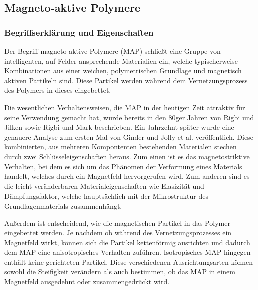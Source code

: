 \subsection{Magneto-aktive Polymere}\label{kap_MAP}
\subsubsection{Begriffserklärung und Eigenschaften}
Der Begriff magneto-aktive Polymere (MAP) schließt eine Gruppe von intelligenten, auf Felder ansprechende Materialien ein, welche typischerweise Kombinationen aus einer weichen, polymetrischen Grundlage und magnetisch aktiven Partikeln sind. Diese Partikel werden während dem Vernetzungsprozess des Polymers in dieses eingebettet. 

Die wesentlichen Verhaltensweisen, die MAP in der heutigen Zeit attraktiv für seine Verwendung gemacht hat, wurde bereits in den 80ger Jahren von Rigbi und Jilken \cite{Rigbi1} sowie Rigbi und Mark \cite{Rigbi2} beschrieben. Ein Jahrzehnt später wurde eine genauere Analyse zum ersten Mal von Ginder und Jolly et al. \cite{ginder} veröffentlich. 
Diese kombinierten, aus mehreren Kompontenten bestehenden Materialen stechen durch zwei Schlüsseleigenschaften heraus. 
Zum einen ist es das magnetostriktive Verhalten, bei dem es sich um das Phänomen der Verformung eines Materials handelt, welches durch ein Magnetfeld hervorgerufen wird. \cite{gulley}
Zum anderen sind es die leicht veränderbaren Materialeigenschaften wie Elasizität und Dämpfungsfaktor, welche hauptsächlich mit der Mikrostruktur des Grundlagenmaterials zusammenhängt. \cite{Varga1} \cite{Varga2}

Außerdem ist entscheidend, wie die magnetischen Partikel in das Polymer eingebettet werden. Je nachdem ob während des Vernetzungsprozesses ein Magnetfeld wirkt, können sich die Partikel kettenförmig ausrichten und dadurch dem MAP eine anisotropisches Verhalten zuführen. Isotropisches MAP hingegen enthält keine gerichteten Partikel. Diese verschiedenen Ausrichtungsarten können sowohl die Steifigkeit verändern als auch bestimmen, ob das MAP in einem Magnetfeld ausgedehnt oder zusammengedrückt wird. 


